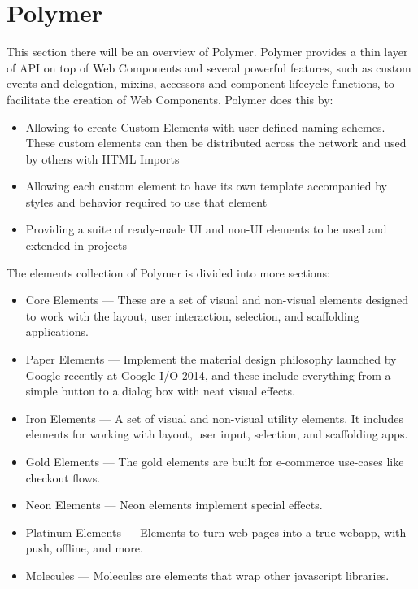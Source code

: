\section{Polymer}
\label{sec:TCH_polymer}

This section there will be an overview of Polymer. Polymer provides a thin layer of API on top of Web Components and several powerful features, such as custom events and delegation, mixins, accessors and component lifecycle functions, to facilitate the creation of Web Components. Polymer does this by:

\begin{itemize}

\item Allowing to create Custom Elements with user-defined naming schemes. These custom elements can then be distributed across the network and used by others with HTML Imports

\item Allowing each custom element to have its own template accompanied by styles and behavior required to use that element

\item Providing a suite of ready-made UI and non-UI elements to be used and extended in projects
\end{itemize}

The elements collection of Polymer is divided into more sections:

\begin{itemize}

\item Core Elements — These are a set of visual and non-visual elements designed to work with the layout, user interaction, selection, and scaffolding applications.
\item Paper Elements — Implement the material design philosophy launched by Google recently at Google I/O 2014, and these include everything from a simple button to a dialog box with neat visual effects.
\item Iron Elements — A set of visual and non-visual utility elements. It includes elements for working with layout, user input, selection, and scaffolding apps.
\item Gold Elements — The gold elements are built for e-commerce use-cases like checkout flows.
\item Neon Elements — Neon elements implement special effects.
\item Platinum Elements — Elements to turn web pages into a true webapp, with push, offline, and more.
\item Molecules — Molecules are elements that wrap other javascript libraries.
\end{itemize}


